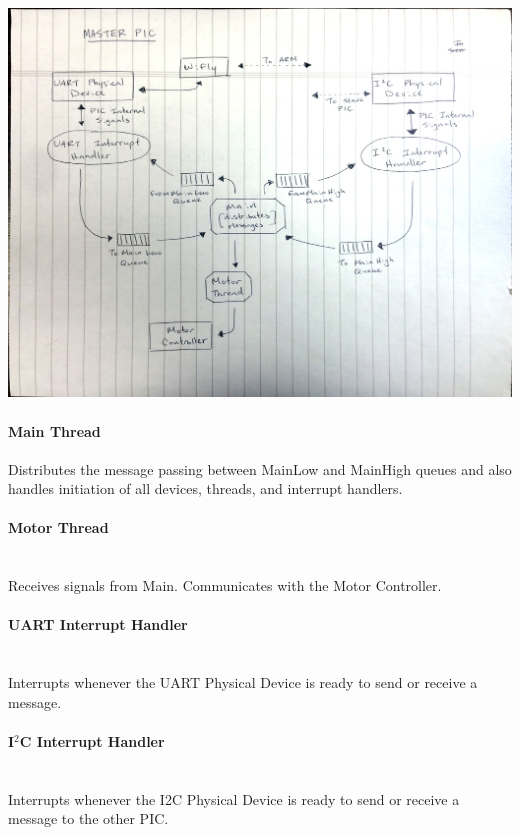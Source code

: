 \begin{center}
	\includegraphics[scale=0.45]{Images/MasterTaskDiagram}
\end{center}

\paragraph*{Main Thread}


Distributes the message passing between MainLow and MainHigh queues and also handles initiation of all devices, threads, and interrupt handlers. 

\paragraph*{Motor Thread}\mbox{}\\
Receives signals from Main. Communicates with the Motor Controller.

\paragraph*{UART Interrupt Handler}\mbox{}\\
Interrupts whenever the UART Physical Device is ready to send or receive a message. 

\paragraph*{I$^2$C Interrupt Handler}\mbox{}\\
Interrupts whenever the I2C Physical Device is ready to send or receive a message to the other PIC. 

